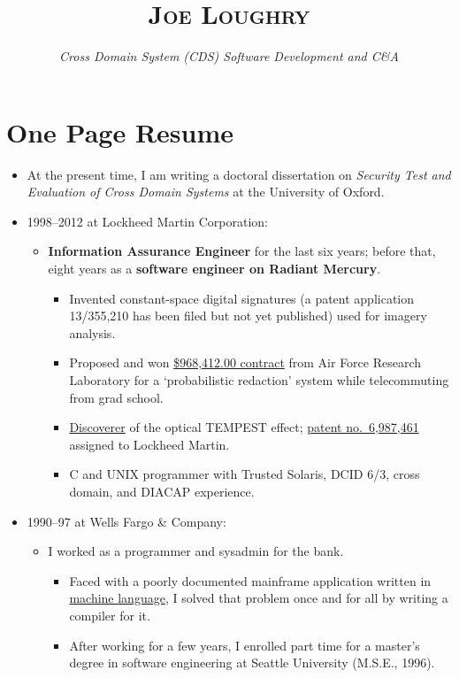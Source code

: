 \documentclass[12pt,letterpaper]{article}
\date{}
\title{\textsc{Joe Loughry}\vspace{-7mm}}
\author{\emph{Cross Domain System (CDS) Software Development and C\&A}}
\begin{document}
\maketitle
\thispagestyle{empty}

\vspace*{-20mm}
\section*{One Page Resume}

\begin{itemize}
	\item At the present time, I am writing a doctoral dissertation on \emph{Security Test and
		Evaluation of Cross Domain Systems} at the University of Oxford.
	\item 1998--2012 at Lockheed Martin Corporation:
		\begin{itemize}
			\item \textbf{Information Assurance Engineer} for the last six years; before that,
				eight years as a \textbf{software engineer on Radiant Mercury}.
				\begin{itemize}
					\item Invented constant-space digital signatures (a patent application
						13/355,210 has been filed but not yet published) used for
						imagery analysis.
					\item Proposed and won
						\href{http://applied-math.org/Probabilistic_Redaction.pdf}{\$968,412.00
						contract} from Air Force Research Laboratory for a `probabilistic
						redaction' system while telecommuting from grad school.
					\item \href{http://applied-math.org/acm_optical_tempest.pdf}{Discoverer}
						of the optical TEMPEST effect;
						\href{http://www.google.com/patents/US6987461}{patent no.\ 6,987,461}
						assigned to Lockheed Martin.
					\item C and UNIX programmer with Trusted Solaris, DCID 6/3, cross domain,
						and DIACAP experience.
				\end{itemize}
		\end{itemize}

	\item 1990--97 at Wells Fargo \& Company:
		\begin{itemize}
			\item I worked as a programmer and sysadmin for the bank.
				\begin{itemize}
					\item Faced with a poorly documented mainframe application written in
						\href{https://github.com/jloughry/BANCStar/blob/master/README.md#code-sample}{machine language},
						I solved that problem once and for all by writing a compiler for it.
					\item After working for a few years, I enrolled part time for a master's
						degree in software engineering at Seattle University (M.S.E., 1996).
				\end{itemize}
		\end{itemize}


\end{itemize}
\end{document}

